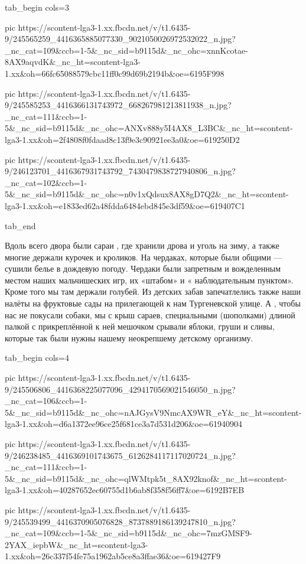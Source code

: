 \ifcmt
  tab_begin cols=3

     pic https://scontent-lga3-1.xx.fbcdn.net/v/t1.6435-9/245565259_4416365885077330_9021050026972532022_n.jpg?_nc_cat=109&ccb=1-5&_nc_sid=b9115d&_nc_ohc=xnnKcotae-8AX9aqvdK&_nc_ht=scontent-lga3-1.xx&oh=66fc65088579cbc11ff0c99d69b2194b&oe=6195F998

     pic https://scontent-lga3-1.xx.fbcdn.net/v/t1.6435-9/245585253_4416366131743972_668267981213811938_n.jpg?_nc_cat=111&ccb=1-5&_nc_sid=b9115d&_nc_ohc=ANXv888y5I4AX8_L3BC&_nc_ht=scontent-lga3-1.xx&oh=2f4808f0fdaad8c13f9e3c90921ee3a0&oe=619250D2

     pic https://scontent-lga3-1.xx.fbcdn.net/v/t1.6435-9/246123701_4416367931743792_7430479838727940806_n.jpg?_nc_cat=102&ccb=1-5&_nc_sid=b9115d&_nc_ohc=n0v1xQdsux8AX8gD7Q2&_nc_ht=scontent-lga3-1.xx&oh=e1833ed62a48fdda6484ebd845e3df59&oe=619407C1

  tab_end
\fi

Вдоль всего двора были сараи , где хранили дрова и уголь на зиму, а также
многие держали курочек и кроликов.  На чердаках, которые были общими — сушили
белье в дождевую погоду. Чердаки были запретным и вожделенным местом наших
мальчишеских игр, их «штабом» и               « наблюдательным пунктом». Кроме
того мы там держали голубей. Из детских забав  запечатлелись также наши налёты
на фруктовые сады на прилегающей к нам Тургеневской улице. А , чтобы нас не
покусали собаки, мы с крыш сараев, специальными (шополками) длиной палкой с
прикреплённой к ней мешочком срывали яблоки, груши и сливы, которые так были
нужны нашему неокрепшему детскому организму.

\ifcmt
  tab_begin cols=4

     pic https://scontent-lga3-1.xx.fbcdn.net/v/t1.6435-9/245506806_4416368225077096_4294170569021546050_n.jpg?_nc_cat=106&ccb=1-5&_nc_sid=b9115d&_nc_ohc=nAJGysV9NmcAX9WR_eY&_nc_ht=scontent-lga3-1.xx&oh=d6a1372ee96ce25f681ce3a7d531d206&oe=61940904

     pic https://scontent-lga3-1.xx.fbcdn.net/v/t1.6435-9/246238485_4416369101743675_6126284117117020724_n.jpg?_nc_cat=111&ccb=1-5&_nc_sid=b9115d&_nc_ohc=qlWMtpk5t_8AX92knof&_nc_ht=scontent-lga3-1.xx&oh=40287652ec60755d1b6ab8f358f56ff7&oe=6192B7EB

     pic https://scontent-lga3-1.xx.fbcdn.net/v/t1.6435-9/245539499_4416370905076828_8737889186139247810_n.jpg?_nc_cat=109&ccb=1-5&_nc_sid=b9115d&_nc_ohc=7mzGMSF9-2YAX_iepbW&_nc_ht=scontent-lga3-1.xx&oh=26c337f54fe75a1962ab5ce8a3ffae36&oe=619427F9

